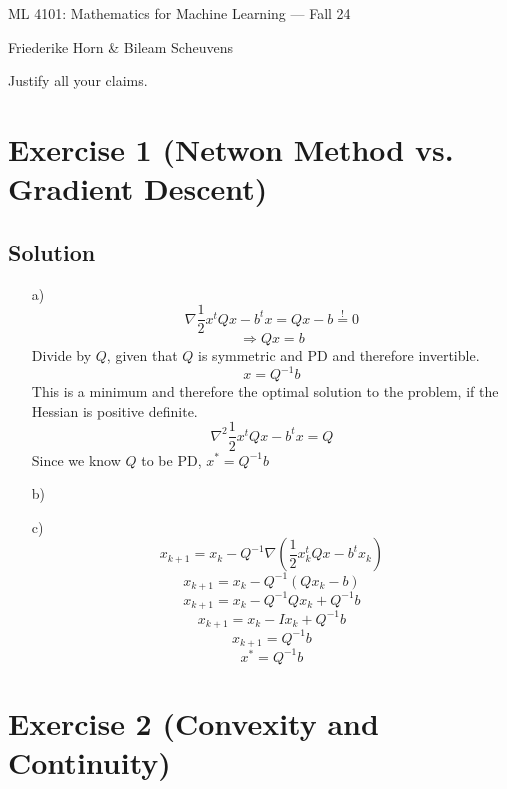 \documentclass[10pt]{article}
\numberwithin{equation}{section}
\begin{document}
\begin{center}
    \sc ML 4101: Mathematics for Machine Learning --- Fall 24
\end{center}

\noindent Friederike Horn \& Bileam Scheuvens

Justify all your claims.
\section*{Exercise 1 (Netwon Method vs. Gradient Descent)}

\subsection*{Solution}

\begin{enumerate}
\item[a)]{
    $$\nabla \frac{1}{2} x^t Qx - b^t x = Qx - b \overset{!}{=} 0$$
    $$ \Rightarrow Qx = b$$
    Divide by $Q$, given that $Q$ is symmetric and PD and therefore invertible.
    $$ x = Q^{-1}b$$
    This is a minimum and therefore the optimal solution to the problem, if the Hessian is positive definite.
    $$\nabla^2 \frac{1}{2} x^t Qx - b^t x = Q$$
    Since we know $Q$ to be PD, $x^* = Q^{-1}b$
  }

\item[b)] {
  }
\item[c)] {
    $$x_{k+1} = x_k - Q^{-1}\nabla (\frac{1}{2} x_k^t Qx - b^t x_k)$$
  $$x_{k+1} = x_k - Q^{-1}(Qx_k - b)$$
  $$x_{k+1} = x_k - Q^{-1}Qx_k + Q^{-1}b$$
  $$x_{k+1} = x_k - Ix_k + Q^{-1}b$$
  $$x_{k+1} = Q^{-1}b$$
  $$x^* = Q^{-1}b$$
}
\end{enumerate}
\section*{Exercise 2 (Convexity and Continuity)}
\end{document}
